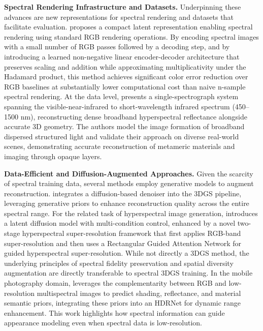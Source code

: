 \documentclass[11pt]{article}
\begin{document}
\textbf{Spectral Rendering Infrastructure and Datasets.} Underpinning these advances are new representations for spectral rendering and datasets that facilitate evaluation. \cite{ref626} proposes a compact latent representation enabling spectral rendering using standard RGB rendering operations. By encoding spectral images with a small number of RGB passes followed by a decoding step, and by introducing a learned non-negative linear encoder-decoder architecture that preserves scaling and addition while approximating multiplicativity under the Hadamard product, this method achieves significant color error reduction over RGB baselines at substantially lower computational cost than naive n-sample spectral rendering. At the data level, \cite{ref627} presents a single-spectrograph system spanning the visible-near-infrared to short-wavelength infrared spectrum (450--1500 nm), reconstructing dense broadband hyperspectral reflectance alongside accurate 3D geometry. The authors model the image formation of broadband dispersed structured light and validate their approach on diverse real-world scenes, demonstrating accurate reconstruction of metameric materials and imaging through opaque layers.

\textbf{Data-Efficient and Diffusion-Augmented Approaches.} Given the scarcity of spectral training data, several methods employ generative models to augment reconstruction. \cite{ref616} integrates a diffusion-based denoiser into the 3DGS pipeline, leveraging generative priors to enhance reconstruction quality across the entire spectral range. For the related task of hyperspectral image generation, \cite{ref628} introduces a latent diffusion model with multi-condition control, enhanced by a novel two-stage hyperspectral super-resolution framework that first applies RGB-band super-resolution and then uses a Rectangular Guided Attention Network for guided hyperspectral super-resolution. While not directly a 3DGS method, the underlying principles of spectral fidelity preservation and spatial diversity augmentation are directly transferable to spectral 3DGS training. In the mobile photography domain, \cite{ref629} leverages the complementarity between RGB and low-resolution multispectral images to predict shading, reflectance, and material semantic priors, integrating these priors into an HDRNet for dynamic range enhancement. This work highlights how spectral information can guide appearance modeling even when spectral data is low-resolution.
\end{document}
